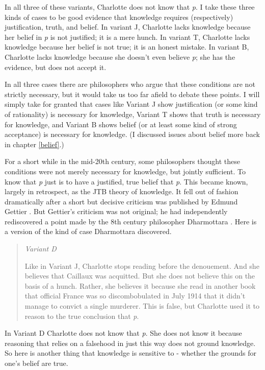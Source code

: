 \documentclass[
  11pt,
]{book}
\begin{document}
In all three of these variants, Charlotte does not know that \emph{p}. I take these three kinds of cases to be good evidence that knowledge requires (respectively) justification, truth, and belief. In variant J, Charlotte lacks knowledge because her belief in \emph{p} is not justified; it is a mere hunch. In variant T, Charlotte lacks knowledge because her belief is not true; it is an honest mistake. In variant B, Charlotte lacks knowledge because she doesn't even believe \emph{p}; she has the evidence, but does not accept it.

In all three cases there are philosophers who argue that these conditions are not strictly necessary, but it would take us too far afield to debate these points. I will simply take for granted that cases like Variant J show justification (or some kind of rationality) is necessary for knowledge, Variant T shows that truth is necessary for knowledge, and Variant B shows belief (or at least some kind of strong acceptance) is necessary for knowledge. (I discussed issues about belief more back in chapter \ref{belief}.)

For a short while in the mid-20th century, some philosophers thought these conditions were not merely necessary for knowledge, but jointly sufficient. To know that \emph{p}
just is to have a justified, true belief that \emph{p}. This became known, largely in retrospect, as the JTB theory of knowledge. It fell out of fashion dramatically after a short but decisive criticism was published by Edmund Gettier \citeyearpar{Gettier1963}. But Gettier's criticism was not original; he had independently rediscovered a point made by the 8th century philosopher Dharmottara \citep{Nagel2014}. Here is a version of the kind of case Dharmottara discovered.

\begin{quote}
\emph{Variant D}

Like in Variant J, Charlotte stops reading before the denouement. And she believes that Caillaux was acquitted. But she does not believe this on the basis of a hunch. Rather, she believes it because she read in another book that official France was so discombobulated in July 1914 that it didn't manage to convict a single murderer. This is false, but Charlotte used it to reason to the true conclusion that \emph{p}.
\end{quote}

In Variant D Charlotte does not know that \emph{p}. She does not know it because reasoning that relies on a falsehood in just this way does not ground knowledge. So here is another thing that knowledge is sensitive to - whether the grounds for one's belief are true.
\end{document}
